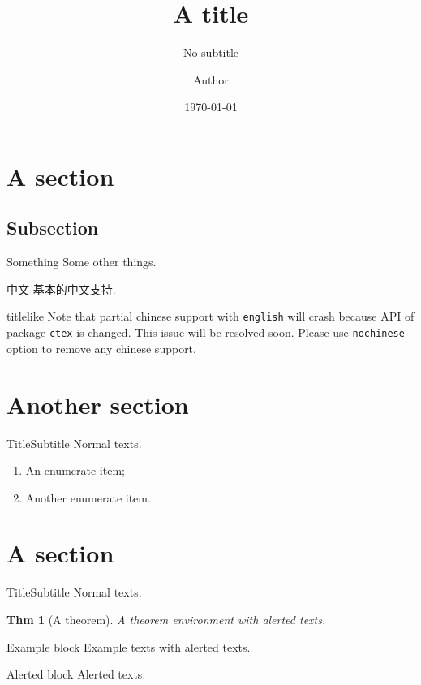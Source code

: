 \documentclass[english, nochinese]{pkuslide}
\title{A title}
\subtitle{No subtitle}
\institute{Peking University}
\author{Author}
\date{\today}
\newtheorem{Thm}{Thm}
\begin{document}
	\begin{frame}
\titlepage
	\end{frame}

	\begin{frame}
\tableofcontents[subsectionstyle=show]
	\end{frame}

\section{A section}

\subsection{Subsection}

	\begin{frame}{Something}
\centering
Some other things.
	\end{frame}

	\begin{frame}{中文}
基本的中文支持.

\begin{beamercolorbox}{titlelike}
Note that partial chinese support with \texttt{english} will crash because API of package \texttt{ctex} is changed. This issue will be resolved soon. Please use \texttt{nochinese} option to remove any chinese support.
\end{beamercolorbox}
	\end{frame}

\section{Another section}

	\frame{\sectionpage}

	\begin{frame}{Title}{Subtitle}
Normal texts.
\begin{enumerate}
\item An enumerate item;
\item Another enumerate item.
\end{enumerate}
	\end{frame}

\section{A section}

	\frame{\sectionpage}

	\begin{frame}{Title}{Subtitle}
Normal texts.
\begin{Thm}[A theorem]
A theorem environment with \alert{alerted} texts.
\end{Thm}
\begin{exampleblock}{Example block}
Example texts with \alert{alerted} texts.
\end{exampleblock}
\begin{alertblock}{Alerted block}
Alerted texts.
\end{alertblock}
	\end{frame}
\end{document}
